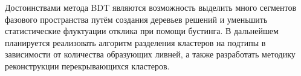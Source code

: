 \documentclass[14pt]{extarticle}
\begin{document}
Достоинствами метода BDT являются возможность выделить много сегментов фазового пространства путём создания деревьев решений и уменьшить статистические флуктуации отклика при помощи бустинга. В дальнейшем планируется реализовать алгоритм разделения кластеров на подтипы в зависимости от количества образующих ливней, а также разработать методику реконструкции перекрывающихся кластеров.


\end{document}
